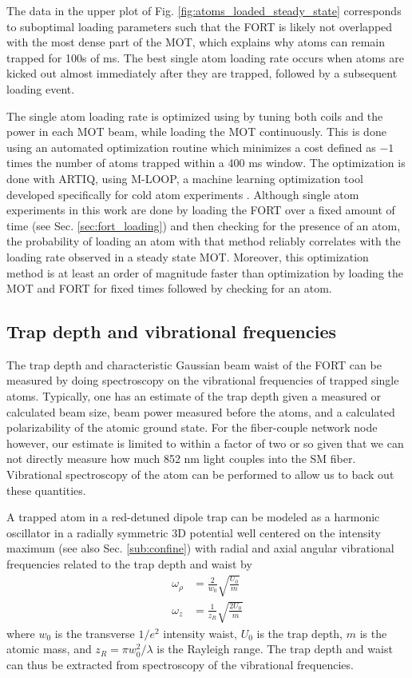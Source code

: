 The data in the upper plot of Fig. \ref{fig:atoms_loaded_steady_state} corresponds to suboptimal loading parameters such that the FORT is likely not overlapped with the most dense part of the MOT, which explains why atoms can remain trapped for 100s of ms. The best single atom loading rate occurs when atoms are kicked out almost immediately after they are trapped, followed by a subsequent loading event.

The single atom loading rate is optimized using by tuning both coils and the power in each MOT beam, while loading the MOT continuously. This is done using an automated optimization routine which minimizes a cost defined as $-1$ times the number of atoms trapped within a 400 ms window. The optimization is done with ARTIQ, using M-LOOP, a machine learning optimization tool developed specifically for cold atom experiments \cite{Wigley2016}. Although single atom experiments in this work are done by loading the FORT over a fixed amount of time (see Sec. \ref{sec:fort_loading}) and then checking for the presence of an atom, the probability of loading an atom with that method reliably correlates with the loading rate observed in a steady state MOT. Moreover, this optimization method is at least an order of magnitude faster than optimization by loading the MOT and FORT for fixed times followed by checking for an atom. 

\subsection{Trap depth and vibrational frequencies}

The trap depth and characteristic Gaussian beam waist of the FORT can be measured by doing spectroscopy on the vibrational frequencies of trapped single atoms. Typically, one has an estimate of the trap depth given a measured or calculated beam size, beam power measured before the atoms, and a calculated polarizability of the atomic ground state. For the fiber-couple network node however, our estimate is limited to within a factor of two or so given that we can not directly measure how much 852 nm light couples into the SM fiber. Vibrational spectroscopy of the atom can be performed to allow us to back out these quantities.

A trapped atom in a red-detuned dipole trap can be modeled as a harmonic oscillator in a radially symmetric 3D potential well centered on the intensity maximum (see also Sec. \ref{sub:confine}) with radial and axial angular vibrational frequencies related to the trap depth and waist by
\begin{align}\label{eq:trapfreqs}
    \omega_{\rho} &= \frac{2}{w_0}\sqrt{\frac{U_0}{m}} \\
    \omega_z &= \frac{1}{z_R}\sqrt{\frac{2U_0}{m}}
\end{align}
where $w_0$ is the transverse $1/e^2$ intensity waist, $U_0$ is the trap depth, $m$ is the atomic mass, and $z_R=\pi w_0^2/\lambda$ is the Rayleigh range. The trap depth and waist can thus be extracted from spectroscopy of the vibrational frequencies. 

